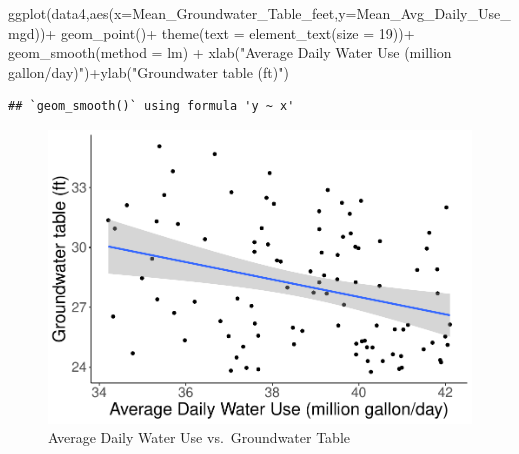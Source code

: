 \documentclass[
  12pt,
]{article}
\newenvironment{Shaded}{\begin{snugshade}}{\end{snugshade}}
\newcommand{\AttributeTok}[1]{\textcolor[rgb]{0.77,0.63,0.00}{#1}}
\newcommand{\DecValTok}[1]{\textcolor[rgb]{0.00,0.00,0.81}{#1}}
\newcommand{\FunctionTok}[1]{\textcolor[rgb]{0.00,0.00,0.00}{#1}}
\newcommand{\NormalTok}[1]{#1}
\newcommand{\SpecialCharTok}[1]{\textcolor[rgb]{0.00,0.00,0.00}{#1}}
\newcommand{\StringTok}[1]{\textcolor[rgb]{0.31,0.60,0.02}{#1}}
\begin{document}
\begin{Shaded}
\begin{Highlighting}[]
\FunctionTok{ggplot}\NormalTok{(data4,}\FunctionTok{aes}\NormalTok{(}\AttributeTok{x=}\NormalTok{Mean\_Groundwater\_Table\_feet,}\AttributeTok{y=}\NormalTok{Mean\_Avg\_Daily\_Use\_mgd))}\SpecialCharTok{+}
       \FunctionTok{geom\_point}\NormalTok{()}\SpecialCharTok{+}
  \FunctionTok{theme}\NormalTok{(}\AttributeTok{text =} \FunctionTok{element\_text}\NormalTok{(}\AttributeTok{size =} \DecValTok{19}\NormalTok{))}\SpecialCharTok{+}
  \FunctionTok{geom\_smooth}\NormalTok{(}\AttributeTok{method =}\NormalTok{ lm) }\SpecialCharTok{+}
  \FunctionTok{xlab}\NormalTok{(}\StringTok{"Average Daily Water Use (million gallon/day)"}\NormalTok{)}\SpecialCharTok{+}\FunctionTok{ylab}\NormalTok{(}\StringTok{"Groundwater table (ft)"}\NormalTok{)}
\end{Highlighting}
\end{Shaded}

\begin{verbatim}
## `geom_smooth()` using formula 'y ~ x'
\end{verbatim}

\begin{figure}
\centering
\includegraphics{Project_files/figure-latex/m4-1.pdf}
\caption{Average Daily Water Use vs.~Groundwater Table}
\end{figure}
\end{document}
